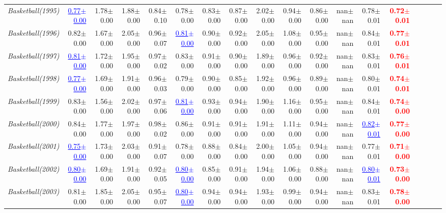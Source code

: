 \documentclass[nohyperref]{article}
\theoremstyle{plain}
\theoremstyle{definition}
\theoremstyle{remark}
\newcommand{\red}[1]{\textcolor{red}{\textbf{#1}}}
\newcommand{\blue}[1]{\textcolor{blue}{\underline{#1}}}
\begin{document}
\begin{table*}[!ht]
{\begin{tabular}{lrrrrrrrrrrrrrrrrr}
			{\it Basketball(1995)} & \blue{0.77$\pm$0.00} & 1.78$\pm$0.00 & 1.88$\pm$0.00 & 0.84$\pm$0.10 & 0.78$\pm$0.00 & 0.83$\pm$0.00 & 0.87$\pm$0.00 & 2.02$\pm$0.00 & 0.94$\pm$0.00 & 0.86$\pm$0.00 & nan$\pm$nan & 0.78$\pm$0.01 & \red{0.72$\pm$0.01} \\
			{\it Basketball(1996)} & 0.82$\pm$0.00 & 1.67$\pm$0.00 & 2.05$\pm$0.00 & 0.96$\pm$0.07 & \blue{0.81$\pm$0.00} & 0.90$\pm$0.00 & 0.92$\pm$0.00 & 2.05$\pm$0.00 & 1.08$\pm$0.00 & 0.95$\pm$0.00 & nan$\pm$nan & 0.84$\pm$0.01 & \red{0.77$\pm$0.01} \\
			{\it Basketball(1997)} & \blue{0.81$\pm$0.00} & 1.72$\pm$0.00 & 1.95$\pm$0.00 & 0.97$\pm$0.02 & 0.83$\pm$0.00 & 0.91$\pm$0.00 & 0.90$\pm$0.00 & 1.89$\pm$0.00 & 0.96$\pm$0.00 & 0.92$\pm$0.00 & nan$\pm$nan & 0.83$\pm$0.01 & \red{0.76$\pm$0.01} \\
			{\it Basketball(1998)} & \blue{0.77$\pm$0.00} & 1.69$\pm$0.00 & 1.91$\pm$0.00 & 0.96$\pm$0.03 & 0.79$\pm$0.00 & 0.90$\pm$0.00 & 0.85$\pm$0.00 & 1.92$\pm$0.00 & 0.96$\pm$0.00 & 0.89$\pm$0.00 & nan$\pm$nan & 0.80$\pm$0.01 & \red{0.74$\pm$0.01} \\
			{\it Basketball(1999)} & 0.83$\pm$0.00 & 1.56$\pm$0.00 & 2.02$\pm$0.00 & 0.97$\pm$0.06 & \blue{0.81$\pm$0.00} & 0.93$\pm$0.00 & 0.94$\pm$0.00 & 1.90$\pm$0.00 & 1.16$\pm$0.00 & 0.95$\pm$0.00 & nan$\pm$nan & 0.84$\pm$0.01 & \red{0.74$\pm$0.00} \\
			{\it Basketball(2000)} & 0.84$\pm$0.00 & 1.77$\pm$0.00 & 1.97$\pm$0.00 & 0.98$\pm$0.02 & 0.86$\pm$0.00 & 0.91$\pm$0.00 & 0.91$\pm$0.00 & 1.91$\pm$0.00 & 1.11$\pm$0.00 & 0.94$\pm$0.00 & nan$\pm$nan & \blue{0.82$\pm$0.01} & \red{0.77$\pm$0.00} \\
			{\it Basketball(2001)} & \blue{0.75$\pm$0.00} & 1.73$\pm$0.00 & 2.03$\pm$0.00 & 0.91$\pm$0.07 & 0.78$\pm$0.00 & 0.88$\pm$0.00 & 0.84$\pm$0.00 & 2.00$\pm$0.00 & 1.05$\pm$0.00 & 0.94$\pm$0.00 & nan$\pm$nan & 0.77$\pm$0.01 & \red{0.71$\pm$0.00} \\
			{\it Basketball(2002)} & \blue{0.80$\pm$0.00} & 1.69$\pm$0.00 & 1.91$\pm$0.00 & 0.92$\pm$0.05 & \blue{0.80$\pm$0.00} & 0.85$\pm$0.00 & 0.91$\pm$0.00 & 1.94$\pm$0.00 & 1.06$\pm$0.00 & 0.88$\pm$0.00 & nan$\pm$nan & \blue{0.80$\pm$0.01} & \red{0.73$\pm$0.00} \\
			{\it Basketball(2003)} & 0.81$\pm$0.00 & 1.85$\pm$0.00 & 2.05$\pm$0.00 & 0.95$\pm$0.07 & \blue{0.80$\pm$0.00} & 0.94$\pm$0.00 & 0.94$\pm$0.00 & 1.93$\pm$0.00 & 0.99$\pm$0.00 & 0.94$\pm$0.00 & nan$\pm$nan & 0.83$\pm$0.01 & \red{0.78$\pm$0.00} \\

\end{tabular}}
\end{table*}
\end{document}
